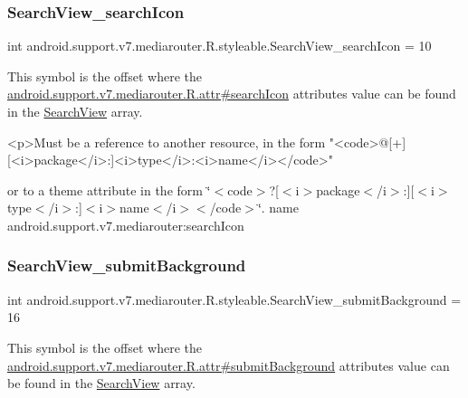 \subsubsection{\texorpdfstring{Search\+View\+\_\+search\+Icon}{SearchView\_searchIcon}}
{\footnotesize\ttfamily int android.\+support.\+v7.\+mediarouter.\+R.\+styleable.\+Search\+View\+\_\+search\+Icon = 10\hspace{0.3cm}{\ttfamily [static]}}

This symbol is the offset where the \hyperlink{classandroid_1_1support_1_1v7_1_1mediarouter_1_1R_1_1attr_a86c45b75b0c4e4e5fa1de4a74e677040}{android.\+support.\+v7.\+mediarouter.\+R.\+attr\#search\+Icon} attribute\textquotesingle{}s value can be found in the \hyperlink{classandroid_1_1support_1_1v7_1_1mediarouter_1_1R_1_1styleable_a5573e3195bf93122a37c69394418c7d7}{Search\+View} array.

\begin{DoxyVerb}      <p>Must be a reference to another resource, in the form "<code>@[+][<i>package</i>:]<i>type</i>:<i>name</i></code>"
\end{DoxyVerb}
 or to a theme attribute in the form \char`\"{}$<$code$>$?\mbox{[}$<$i$>$package$<$/i$>$\+:\mbox{]}\mbox{[}$<$i$>$type$<$/i$>$\+:\mbox{]}$<$i$>$name$<$/i$>$$<$/code$>$\char`\"{}.  name android.\+support.\+v7.\+mediarouter\+:search\+Icon \mbox{\label{classandroid_1_1support_1_1v7_1_1mediarouter_1_1R_1_1styleable_ae515cfc893e5d3141dabbb0ddfecaa09}} 
\subsubsection{\texorpdfstring{Search\+View\+\_\+submit\+Background}{SearchView\_submitBackground}}
{\footnotesize\ttfamily int android.\+support.\+v7.\+mediarouter.\+R.\+styleable.\+Search\+View\+\_\+submit\+Background = 16\hspace{0.3cm}{\ttfamily [static]}}

This symbol is the offset where the \hyperlink{classandroid_1_1support_1_1v7_1_1mediarouter_1_1R_1_1attr_a49c44635804f56e76dc9ee2f70f461fc}{android.\+support.\+v7.\+mediarouter.\+R.\+attr\#submit\+Background} attribute\textquotesingle{}s value can be found in the \hyperlink{classandroid_1_1support_1_1v7_1_1mediarouter_1_1R_1_1styleable_a5573e3195bf93122a37c69394418c7d7}{Search\+View} array.

